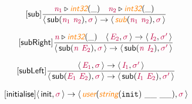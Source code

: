 \documentclass[10pt,leqno,fleqn]{article}
\newcommand{\artVariable}[1]{\mbox{\color{purple}\em #1\/}}
\newcommand{\artConstructor}[1]{\mbox{\sf #1}}
\newcommand{\artCaseInsensitiveLiteral}[1]{\mbox{\tt #1}}
\newcommand{\artSpecial}[1]{\mbox{\color{orange}\sf\em #1}}
\begin{document}
\begin{equation}
\tag*{[\artConstructor{\sf sub}]}
\begin{split}\frac{ \artVariable{n$_{1}$}\triangleright \artSpecial{int32}(\_) \quad  \artVariable{n$_{2}$}\triangleright \artSpecial{int32}(\_) }{\langle\, \artConstructor{\sf sub}(\artVariable{n$_{1}$}\ \artVariable{n$_{2}$}), \artVariable{$\sigma$}\,\rangle \rightarrow \langle\, \artSpecial{sub}(\artVariable{n$_{1}$}\ \artVariable{n$_{2}$}), \artVariable{$\sigma$}\,\rangle }
\end{split}
\end{equation}

\begin{equation}
\tag*{[\artConstructor{\sf subRight}]}
\begin{split}\frac{ \artVariable{n}\triangleright \artSpecial{int32}(\_) \quad \langle\, \artVariable{E$_{2}$}, \artVariable{$\sigma$}\,\rangle \rightarrow \langle\, \artVariable{I$_{2}$}, \artVariable{$\sigma$\/$^\prime$}\,\rangle }{\langle\, \artConstructor{\sf sub}(\artVariable{n}\ \artVariable{E$_{2}$}), \artVariable{$\sigma$}\,\rangle \rightarrow \langle\, \artConstructor{\sf sub}(\artVariable{n}\ \artVariable{I$_{2}$}), \artVariable{$\sigma$\/$^\prime$}\,\rangle }
\end{split}
\end{equation}

\begin{equation}
\tag*{[\artConstructor{\sf subLeft}]}
\begin{split}\frac{\langle\, \artVariable{E$_{1}$}, \artVariable{$\sigma$}\,\rangle \rightarrow \langle\, \artVariable{I$_{1}$}, \artVariable{$\sigma$\/$^\prime$}\,\rangle }{\langle\, \artConstructor{\sf sub}(\artVariable{E$_{1}$}\ \artVariable{E$_{2}$}), \artVariable{$\sigma$}\,\rangle \rightarrow \langle\, \artConstructor{\sf sub}(\artVariable{I$_{1}$}\ \artVariable{E$_{2}$}), \artVariable{$\sigma$\/$^\prime$}\,\rangle }
\end{split}
\end{equation}

\begin{equation}
\tag*{[\artConstructor{\sf initialise}]}
\begin{split}\langle\, \artConstructor{\sf init}, \artVariable{$\sigma$}\,\rangle \rightarrow \langle\, \artSpecial{user}(\artSpecial{string}(\artCaseInsensitiveLiteral{init})\ \_\_\ \_\_), \artVariable{$\sigma$}\,\rangle 
\end{split}
\end{equation}
\end{document}
